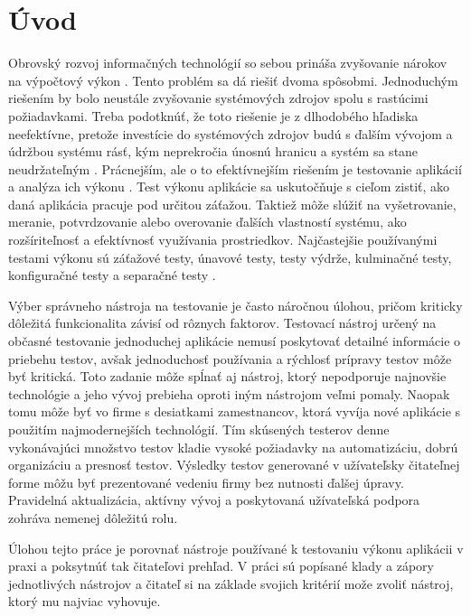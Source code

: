 \documentclass[12pt,oneside,final]{fithesis-utf8}
\begin{document}
\chapter{Úvod}
Obrovský rozvoj informačných technológií so sebou prináša zvyšovanie nárokov na
výpočtový výkon \cite{ComputingPower}. Tento problém sa dá riešiť dvoma spôsobmi. Jednoduchým riešením 
by bolo neustále zvyšovanie systémových zdrojov spolu s rastúcimi požiadavkami. Treba 
podotknúť, že toto riešenie je z dlhodobého hľadiska neefektívne, pretože investície do 
systémových zdrojov budú s ďalším vývojom a údržbou systému rásť, kým neprekročia 
únosnú hranicu a systém sa stane neudržateľným \cite{Sochor}. Prácnejším, ale o to efektívnejším 
riešením je testovanie aplikácií a analýza ich výkonu \cite{Art}. Test výkonu aplikácie sa 
uskutočňuje s cieľom zistiť, ako daná aplikácia pracuje pod určitou záťažou. Taktiež môže 
slúžiť na vyšetrovanie, meranie, potvrdzovanie alebo overovanie ďalších vlastností systému, 
ako rozšíriteľnosť a efektívnosť využívania prostriedkov. Najčastejšie používanými testami 
výkonu sú záťažové testy, únavové testy, testy výdrže, kulminačné testy, konfiguračné testy a separačné testy \cite{Art}.
\newline
\par
Výber správneho nástroja na testovanie je často náročnou úlohou, pričom kriticky dôležitá funkcionalita závisí od rôznych faktorov. Testovací nástroj určený na občasné testovanie jednoduchej aplikácie nemusí  poskytovať detailné informácie o priebehu testov, avšak jednoduchosť používania a rýchlosť prípravy testov môže byť kritická. Toto zadanie môže spĺnať aj nástroj, ktorý nepodporuje najnovšie technológie a jeho vývoj prebieha oproti iným nástrojom veľmi pomaly. Naopak tomu môže byť vo firme s desiatkami zamestnancov, ktorá vyvíja nové aplikácie s použitím najmodernejších technológií. Tím skúsených testerov denne vykonávajúci množstvo testov kladie vysoké požiadavky na automatizáciu, dobrú organizáciu a presnosť testov. Výsledky testov generované v užívateľsky čitateľnej forme môžu byť prezentované vedeniu firmy bez nutnosti ďalšej úpravy. Pravidelná aktualizácia, aktívny vývoj a poskytovaná užívateľská podpora zohráva nemenej dôležitú rolu.
\newline
\par
Úlohou tejto práce je porovnať nástroje používané k testovaniu výkonu aplikácii v praxi a poksytnúť tak čitateľovi prehľad. V práci sú popísané klady a zápory jednotlivých nástrojov a čitateľ si na základe svojich kritérií može zvoliť nástroj, ktorý mu najviac vyhovuje.
\end{document}
